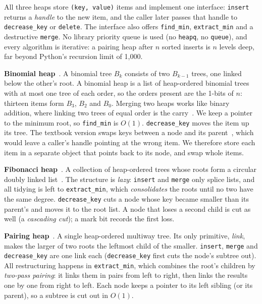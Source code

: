 \documentclass[acmsmall,nonacm]{acmart}
\newcommand{\code}[1]{\texttt{#1}}
\begin{document}
All three heaps store \code{(key, value)} items and implement one interface:
\code{insert} returns a \emph{handle} to the new item, and the caller later
passes that handle to \code{decrease\_key} or \code{delete}. The interface also
offers \code{find\_min}, \code{extract\_min} and a destructive \code{merge}.
No library priority queue is used (no \code{heapq}, no \code{queue}), and every
algorithm is iterative: a pairing heap after $n$ sorted inserts is $n$ levels
deep, far beyond Python's recursion limit of 1,000.

\textbf{Binomial heap}~\cite{vuillemin1978,brown1978}. A binomial tree $B_k$
consists of two $B_{k-1}$ trees, one linked below the other's root. A binomial
heap is a list of heap-ordered binomial trees with at most one tree of each
order, so the orders present are the 1-bits of $n$: thirteen items form $B_3$,
$B_2$ and $B_0$. Merging two heaps works like binary addition, where linking two
trees of equal order is the carry~\cite[Problem~19-2]{cormen2009}. We keep a
pointer to the minimum root, so \code{find\_min} is $O(1)$.
\code{decrease\_key} moves the item up its tree. The textbook version swaps
keys between a node and its parent~\cite[ch.~19]{cormen2001}, which would leave
a caller's handle pointing at the wrong item. We therefore store each item in a
separate object that points back to its node, and swap whole items.

\textbf{Fibonacci heap}~\cite{fredman1987}. A collection of heap-ordered trees
whose roots form a circular doubly linked list~\cite[ch.~19]{cormen2009}. The
structure is \emph{lazy}: \code{insert} and \code{merge} only splice lists, and
all tidying is left to \code{extract\_min}, which \emph{consolidates} the roots
until no two have the same degree. \code{decrease\_key} cuts a node whose key
became smaller than its parent's and moves it to the root list. A node that
loses a second child is cut as well (a \emph{cascading cut}); a mark bit records
the first loss.

\textbf{Pairing heap}~\cite{fredman1986}. A single heap-ordered multiway tree.
Its only primitive, \emph{link}, makes the larger of two roots the leftmost
child of the smaller. \code{insert}, \code{merge} and \code{decrease\_key} are
one link each (\code{decrease\_key} first cuts the node's subtree out). All
restructuring happens in \code{extract\_min}, which combines the root's
children by \emph{two-pass pairing}: it links them in pairs from left to right,
then links the results one by one from right to left. Each node keeps a
pointer to its left sibling (or its parent), so a subtree is cut out in $O(1)$.
\end{document}
